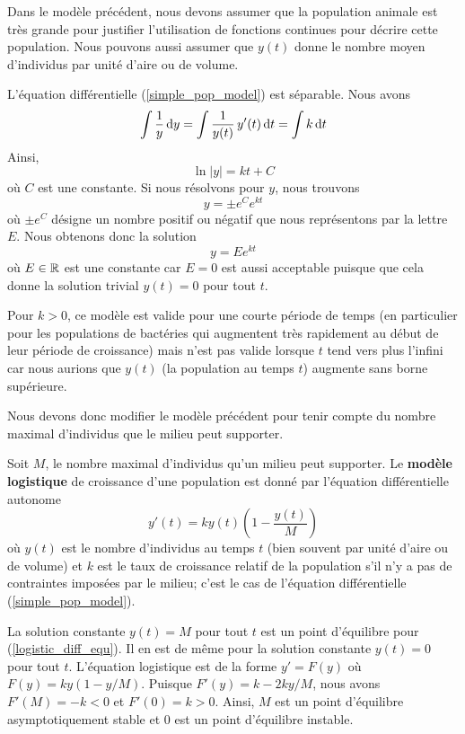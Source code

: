 {Dans le modèle précédent, nous devons assumer que la population animale
est très grande pour justifier l'utilisation de fonctions continues
pour décrire cette population.  Nous pouvons aussi assumer que $y(t)$ donne
le nombre moyen d'individus par unité d'aire ou de volume.

L'équation différentielle (\ref{simple_pop_model}) est séparable.
Nous avons
\[
\int \frac{1}{y} \,\mathrm{d}y = \int \frac{1}{y(t)} \, y'(t) \,\mathrm{d}t = \int k \,\mathrm{d}t
\]
Ainsi,
\[
\ln|y| = kt + C
\]
où $C$ est une constante.  Si nous résolvons pour $y$, nous trouvons
\[
y = \pm e^C e^{kt}
\]
où $\pm e^C$ désigne un nombre positif ou négatif que nous représentons
par la lettre $E$.  Nous obtenons donc la solution 
\begin{equation} \label{sol_s_pop_model}
y = E e^{kt}
\end{equation}
où $E\in \mathbb{R}$ est une constante car $E=0$ est aussi acceptable puisque
que cela donne la solution trivial $y(t)=0$ pour tout $t$.

Pour $k>0$, ce modèle est valide pour une courte période de temps (en
particulier pour les populations de bactéries qui augmentent très
rapidement au début de leur période de croissance) mais n'est pas
valide lorsque $t$ tend vers plus l'infini car nous aurions que $y(t)$
(la population au temps $t$) augmente sans borne supérieure.

Nous devons donc modifier le modèle précédent pour tenir compte du nombre
maximal d'individus que le milieu peut supporter.

Soit $M$, le nombre maximal d'individus qu'un milieu peut supporter.
Le {\bfseries modèle logistique}
 de croissance d'une
population est donné par l'équation différentielle autonome
\begin{equation}\label{logistic_diff_equ}
y'(t) = k y(t) \left(1 - \frac{y(t)}{M}\right)
\end{equation}
où $y(t)$ est le nombre d'individus au temps $t$ (bien souvent par
unité d'aire ou de volume) et $k$ est le taux de croissance relatif de
la population s'il n'y a pas de contraintes imposées par le milieu;
c'est le cas de l'équation différentielle (\ref{simple_pop_model}).

La solution constante $y(t) = M$ pour tout $t$
est un point d'équilibre pour (\ref{logistic_diff_equ}).  Il en est de
même pour la solution constante $y(t) = 0$ pour tout $t$.
L'équation logistique est de la forme $y'= F(y)$ où
$F(y) = ky(1-y/M)$.  Puisque $F'(y) = k -2ky/M$, nous avons
$F'(M) = -k <0$ et $F'(0) = k >0$.   Ainsi, $M$ est un point
d'équilibre asymptotiquement stable et $0$ est un point d'équilibre
instable.

}
